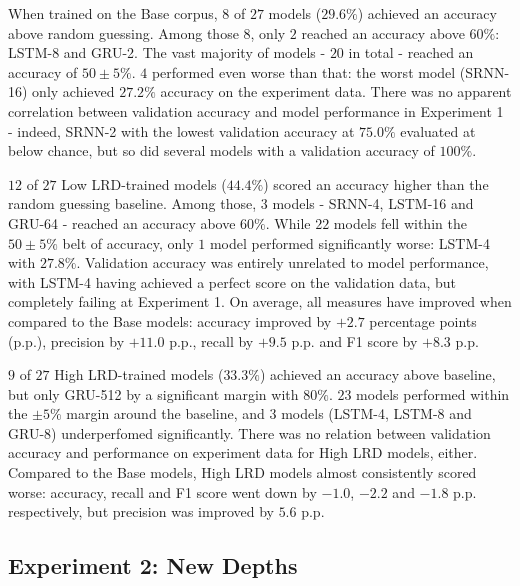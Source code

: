 

When trained on the Base corpus, $8$ of $27$ models ($29.6\%$) achieved an accuracy above random guessing. Among those $8$, only $2$ reached an accuracy above $60\%$: LSTM-8 and GRU-2. The vast majority of models - $20$ in total - reached an accuracy of $50 \pm 5\%$. $4$ performed even worse than that: the worst model (SRNN-16) only achieved $27.2\%$ accuracy on the experiment data. There was no apparent correlation between validation accuracy and model performance in Experiment 1 - indeed, SRNN-2 with the lowest validation accuracy at $75.0\%$ evaluated at below chance, but so did several models with a validation accuracy of $100\%$.



$12$ of $27$ Low LRD-trained models ($44.4\%$) scored an accuracy higher than the random guessing baseline. Among those, $3$ models - SRNN-4, LSTM-16 and GRU-64 - reached an accuracy above $60\%$. While $22$ models fell within the $50 \pm 5\%$ belt of accuracy, only $1$ model performed significantly worse: LSTM-4 with $27.8\%$. Validation accuracy was entirely unrelated to model performance, with LSTM-4 having achieved a perfect score on the validation data, but completely failing at Experiment 1. On average, all measures have improved when compared to the Base models: accuracy improved by $+2.7$ percentage points (p.p.), precision by $+11.0$ p.p., recall by $+9.5$ p.p. and F1 score by $+8.3$ p.p.



$9$ of $27$ High LRD-trained models ($33.3\%$) achieved an accuracy above baseline, but only GRU-512 by a significant margin with $80\%$. $23$ models performed within the $\pm 5\%$ margin around the baseline, and $3$ models (LSTM-4, LSTM-8 and GRU-8) underperfomed significantly. There was no relation between validation accuracy and performance on experiment data for High LRD models, either. Compared to the Base models, High LRD models almost consistently scored worse: accuracy, recall and F1 score went down by $-1.0$, $-2.2$ and $-1.8$ p.p. respectively, but precision was improved by $5.6$ p.p.

\subsection{Experiment 2: New Depths}\label{resultsND}



